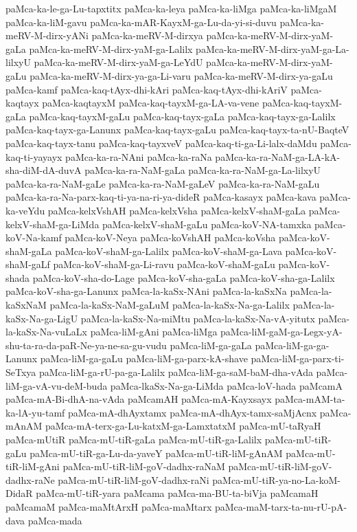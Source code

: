 {paMca-ka-le-ga-Lu-tapxtitx
paMca-ka-leya
paMca-ka-liMga
paMca-ka-liMgaM
paMca-ka-liM-gavu
paMca-ka-mAR-KayxM-ga-Lu-da-yi-si-duvu
paMca-ka-meRV-M-dirx-yANi
paMca-ka-meRV-M-dirxya
paMca-ka-meRV-M-dirx-yaM-gaLa
paMca-ka-meRV-M-dirx-yaM-ga-Lalilx
paMca-ka-meRV-M-dirx-yaM-ga-La-lilxyU
paMca-ka-meRV-M-dirx-yaM-ga-LeYdU
paMca-ka-meRV-M-dirx-yaM-gaLu
paMca-ka-meRV-M-dirx-ya-ga-Li-varu
paMca-ka-meRV-M-dirx-ya-gaLu
paMca-kamf
paMca-kaq-tAyx-dhi-kAri
paMca-kaq-tAyx-dhi-kAriV
paMca-kaqtayx
paMca-kaqtayxM
paMca-kaq-tayxM-ga-LA-va-vene
paMca-kaq-tayxM-gaLa
paMca-kaq-tayxM-gaLu
paMca-kaq-tayx-gaLa
paMca-kaq-tayx-ga-Lalilx
paMca-kaq-tayx-ga-Lanunx
paMca-kaq-tayx-gaLu
paMca-kaq-tayx-ta-nU-BaqteV
paMca-kaq-tayx-tanu
paMca-kaq-tayxveV
paMca-kaq-ti-ga-Li-lalx-daMdu
paMca-kaq-ti-yayayx
paMca-ka-ra-NAni
paMca-ka-raNa
paMca-ka-ra-NaM-ga-LA-kA-sha-diM-dA-duvA
paMca-ka-ra-NaM-gaLa
paMca-ka-ra-NaM-ga-La-lilxyU
paMca-ka-ra-NaM-gaLe
paMca-ka-ra-NaM-gaLeV
paMca-ka-ra-NaM-gaLu
paMca-ka-ra-Na-parx-kaq-ti-ya-na-ri-ya-dideR
paMca-kasayx
paMca-kava
paMca-ka-veYdu
paMca-kelxVshAH
paMca-kelxVsha
paMca-kelxV-shaM-gaLa
paMca-kelxV-shaM-ga-LiMda
paMca-kelxV-shaM-gaLu
paMca-koV-NA-tamxka
paMca-koV-Na-kamf
paMca-koV-Neya
paMca-koVshAH
paMca-koVsha
paMca-koV-shaM-gaLa
paMca-koV-shaM-ga-Lalilx
paMca-koV-shaM-ga-Lava
paMca-koV-shaM-gaLf
paMca-koV-shaM-ga-Li-ravu
paMca-koV-shaM-gaLu
paMca-koV-shada
paMca-koV-sha-do-Lage
paMca-koV-sha-gaLa
paMca-koV-sha-ga-Lalilx
paMca-koV-sha-ga-Lanunx
paMca-la-kaSx-NAni
paMca-la-kaSxNa
paMca-la-kaSxNaM
paMca-la-kaSx-NaM-gaLuM
paMca-la-kaSx-Na-ga-Lalilx
paMca-la-kaSx-Na-ga-LigU
paMca-la-kaSx-Na-miMtu
paMca-la-kaSx-Na-vA-yitutx
paMca-la-kaSx-Na-vuLaLx
paMca-liM-gAni
paMca-liMga
paMca-liM-gaM-ga-Legx-yA-shu-ta-ra-da-paR-Ne-ya-ne-sa-gu-vudu
paMca-liM-ga-gaLa
paMca-liM-ga-ga-Lanunx
paMca-liM-ga-gaLu
paMca-liM-ga-parx-kA-shave
paMca-liM-ga-parx-ti-SeTxya
paMca-liM-ga-rU-pa-ga-Lalilx
paMca-liM-ga-saM-baM-dha-vAda
paMca-liM-ga-vA-vu-deM-buda
paMca-lkaSx-Na-ga-LiMda
paMca-loV-hada
paMcamA
paMca-mA-Bi-dhA-na-vAda
paMcamAH
paMca-mA-Kayxsayx
paMca-mAM-ta-ka-lA-yu-tamf
paMca-mA-dhAyxtamx
paMca-mA-dhAyx-tamx-saMjAcnx
paMca-mAnAM
paMca-mA-terx-ga-Lu-katxM-ga-LamxtatxM
paMca-mU-taRyaH
paMca-mUtiR
paMca-mU-tiR-gaLa
paMca-mU-tiR-ga-Lalilx
paMca-mU-tiR-gaLu
paMca-mU-tiR-ga-Lu-da-yaveY
paMca-mU-tiR-liM-gAnAM
paMca-mU-tiR-liM-gAni
paMca-mU-tiR-liM-goV-dadhx-raNaM
paMca-mU-tiR-liM-goV-dadhx-raNe
paMca-mU-tiR-liM-goV-dadhx-raNi
paMca-mU-tiR-ya-no-La-koM-DidaR
paMca-mU-tiR-yara
paMcama
paMca-ma-BU-ta-biVja
paMcamaH
paMcamaM
paMca-maMtArxH
paMca-maMtarx
paMca-maM-tarx-ta-nu-rU-pA-dava
paMca-mada
}
